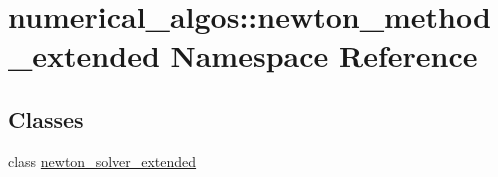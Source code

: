 \hypertarget{namespacenumerical__algos_1_1newton__method__extended}{\section{numerical\-\_\-algos\-:\-:newton\-\_\-method\-\_\-extended Namespace Reference}
\label{namespacenumerical__algos_1_1newton__method__extended}
}
\subsection*{Classes}
\begin{DoxyCompactItemize}
\item 
class \hyperlink{classnumerical__algos_1_1newton__method__extended_1_1newton__solver__extended}{newton\-\_\-solver\-\_\-extended}
\end{DoxyCompactItemize}
